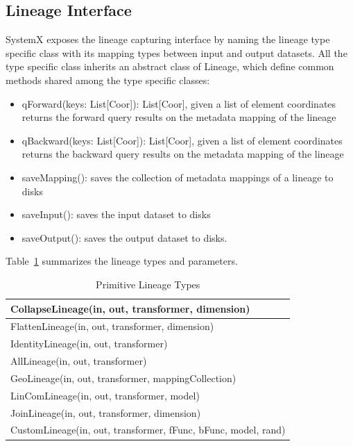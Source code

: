 \documentclass{sig-alternate}
\newenvironment{shortlist}{
        \vspace*{-0.5em}
  \begin{itemize}
  \setlength{\itemsep}{-0.1em}
}{
  \end{itemize}
        \vspace*{-0.5em}
}
\begin{document}
\subsection{Lineage Interface}
\label{sec:Design-Lineage}
SystemX exposes the lineage capturing interface by naming the lineage type specific class with its mapping types between input and output datasets.
All the type specific class inherits an abstract class of Lineage, which define common methods shared among the type specific classes:
\begin{shortlist}
\item{} qForward(keys: List[Coor]): List[Coor], given a list of element coordinates returns the forward query results on the metadata mapping of the lineage
\item{} qBackward(keys: List[Coor]): List[Coor], given a list of element coordinates returns the backward query results on the metadata mapping of the lineage
\item{} saveMapping(): saves the collection of metadata mappings of a lineage to disks
\item{} saveInput(): saves the input dataset to disks
\item{} saveOutput(): saves the output dataset to disks.
\end{shortlist}


Table~\ref{tb:lineage-interface} summarizes the lineage types and parameters.
\begin{table}[t]
\begin{center}
    \caption{Primitive Lineage Types}
    \begin{scriptsize}
    \begin{tabular}{ | p{8cm}|}
    \hline
    CollapseLineage(in, out, transformer, dimension) \\ \hline 
    FlattenLineage(in, out, transformer, dimension) \\ \hline
    IdentityLineage(in, out, transformer) \\ \hline
    AllLineage(in, out, transformer) \\ \hline
    GeoLineage(in, out, transformer, mappingCollection) \\ \hline
    LinComLineage(in, out, transformer, model) \\ \hline
    JoinLineage(in, out, transformer, dimension) \\ \hline
    CustomLineage(in, out, transformer, fFunc, bFunc, model, rand) \\ \hline
    \end{tabular}
    \end{scriptsize}
    \label{tb:lineage-interface}
\end{center}   
\end{table}
\end{document}
